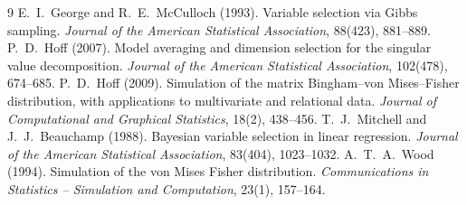 \documentclass[11pt]{article}
\begin{document}
\begin{thebibliography}{9}
 E.~I.~George and R.~E.~McCulloch (1993). Variable selection via Gibbs sampling.
  \emph{Journal of the American Statistical Association}, 88(423), 881--889.
 P.~D.~Hoff (2007). Model averaging and dimension selection for the singular value decomposition.
  \emph{Journal of the American Statistical Association}, 102(478), 674--685.
 P.~D.~Hoff (2009). Simulation of the matrix Bingham--von Mises--Fisher distribution, with
  applications to multivariate and relational data. \emph{Journal of Computational and Graphical Statistics}, 18(2), 438--456.
 T.~J.~Mitchell and J.~J.~Beauchamp (1988). Bayesian variable selection in linear regression.
  \emph{Journal of the American Statistical Association}, 83(404), 1023--1032.
 A.~T.~A.~Wood (1994). Simulation of the von Mises Fisher distribution.
  \emph{Communications in Statistics -- Simulation and Computation}, 23(1), 157--164.
\end{thebibliography}
\end{document}
